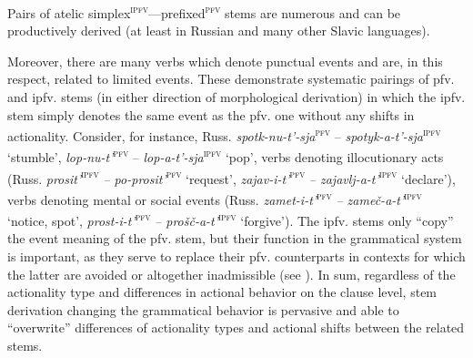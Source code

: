 \documentclass[output=paper]{langscibook}
\begin{document}
Pairs of atelic simplex\textsc{\textsuperscript{ipfv}}—prefixed\textsc{\textsuperscript{pfv}} stems are numerous and can be productively derived (at least in Russian and many other Slavic languages).

Moreover, there are many verbs which denote punctual events and are, in this respect, related to limited events. These demonstrate systematic pairings of pfv. and ipfv. stems (in either direction of morphological derivation) in which the ipfv. stem simply denotes the same event as the pfv. one without any shifts in actionality. Consider, for instance, Russ. \textit{spotk-nu-t’-sja}\textsc{\textsuperscript{pfv}} – \textit{spotyk-a-t’-sja}\textsc{\textsuperscript{ipfv}} ‘stumble’, \textit{lop-nu-t’}\textsc{\textsuperscript{pfv}} – \textit{lop-a-t’-sja}\textsc{\textsuperscript{ipfv}} ‘pop’, verbs denoting illocutionary acts (Russ. \textit{prosit’}\textsc{\textsuperscript{ipfv}} \textit{– po-prosit’}\textsc{\textsuperscript{pfv}} ‘request’, \textit{zajav-i-t’}\textsc{\textsuperscript{pfv}} \textit{– zajavlj-a-t’}\textsc{\textsuperscript{ipfv}} ‘declare’), verbs denoting mental or social events (Russ. \textit{zamet-i-t’}\textsc{\textsuperscript{pfv}} \textit{– zameč-a-t’}\textsc{\textsuperscript{ipfv}} ‘notice, spot’, \textit{prost-i-t’}\textsc{\textsuperscript{pfv}} \textit{– prošč-a-t’}\textsc{\textsuperscript{ipfv}} ‘forgive’). The ipfv. stems only “copy” the event meaning of the pfv. stem, but their function in the grammatical system is important, as they serve to replace their pfv. counterparts in contexts for which the latter are avoided or altogether inadmissible (see ). In sum, regardless of the actionality type and differences in actional behavior on the clause level, stem derivation changing the grammatical behavior is pervasive and able to “overwrite” differences of actionality types and actional shifts between the related stems.
\end{document}
